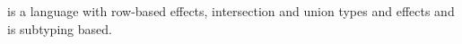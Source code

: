 
\core is a language with row-based effects, intersection and union types and effects and is subtyping based. 
